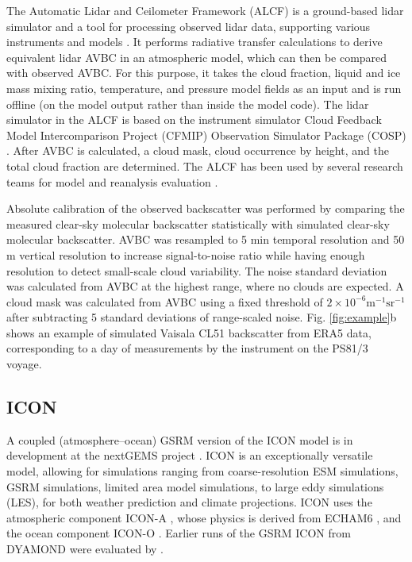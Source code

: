 \documentclass[12pt,a4paper]{article}
\begin{document}
The Automatic Lidar and Ceilometer Framework (ALCF) is a ground-based lidar
simulator and a tool for processing observed lidar data, supporting various
instruments and models \citep{kuma2021}. It performs radiative transfer
calculations to derive equivalent lidar AVBC in an atmospheric model, which can
then be compared with observed AVBC. For this purpose, it takes the cloud fraction, liquid and ice mass mixing ratio, temperature, and
pressure model fields as an input and is run offline (on the model output rather than
inside the model code). The lidar simulator in the ALCF is based on the
instrument simulator Cloud Feedback Model Intercomparison Project (CFMIP)
Observation Simulator Package (COSP) \citep{bodas-salcedo2011}.  After AVBC is
calculated, a cloud mask, cloud occurrence by height, and the total cloud
fraction are determined. The ALCF has been used by several research teams for
model and reanalysis evaluation
\citep{kuma2020,kremser2021,guyot2022,pei2023,whitehead2023,mcdonald2024}.

Absolute calibration of the observed backscatter was performed by comparing the
measured clear-sky molecular backscatter statistically with simulated clear-sky
molecular backscatter. AVBC was resampled to 5 min temporal resolution and 50 m
vertical resolution to increase signal-to-noise ratio while having enough
resolution to detect small-scale cloud variability. The noise standard
deviation was calculated from AVBC at the highest range, where no clouds are
expected.  A cloud mask was calculated from AVBC using a fixed threshold of
$\mathrm{2\times 10^{-6} m^{-1}sr^{-1}}$ after subtracting 5 standard
deviations of range-scaled noise. Fig. \ref{fig:example}b shows an example of
simulated Vaisala CL51 backscatter from ERA5 data, corresponding to a day of
measurements by the instrument on the PS81/3 voyage.

\subsection{ICON}

A coupled (atmosphere--ocean) GSRM version of the ICON model is in development
at the nextGEMS project \citep{hohenegger2023}. ICON is an exceptionally
versatile model, allowing for simulations ranging from coarse-resolution ESM
simulations, GSRM simulations, limited area model simulations, to large eddy
simulations (LES), for both weather prediction and climate projections. ICON
uses the atmospheric component ICON-A \citep{giorgetta2018}, whose physics is
derived from ECHAM6 \citep{stevens2013}, and the ocean component ICON-O
\citep{korn2022}. Earlier runs of the GSRM ICON from DYAMOND were evaluated by
\cite{mauritsen2022}.
\end{document}
